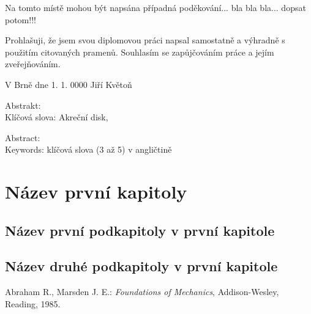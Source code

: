 \documentclass[12pt,notitlepage]{report}
\begin{document}
\normalsize 
\setcounter{page}{3}
\vspace{10mm}

\noindent Na tomto místě mohou být napsána případná poděkování... bla bla bla... dopsat potom!!!

\vspace{\fill}
\noindent Prohlašuji, že jsem svou diplomovou práci napsal samostatně a výhradně s použitím citovaných pramenů.
 Souhlasím se zapůjčováním práce a jejím zveřejňováním.

\bigskip
\noindent V Brně dne 1. 1. 0000 \hspace{\fill}Jiří Květoň
\newpage

%
%
\noindent
\noindent Abstrakt:
\noindent \\
\noindent Klíčová slova: Akreční disk, 
\vspace{10mm}

\noindent Abstract: 
\noindent \\
\noindent Keywords: klíčová slova (3 až 5) v angličtině
\newpage

%
%
\tableofcontents
\newpage

%
%
\chapter{Název první kapitoly}
\section{Název první podkapitoly v první kapitole}
\section{Název druhé podkapitoly v první kapitole}



\begin{thebibliography}{99}
 Abraham R., Marsden J. E.: {\em Foundations of Mechanics}, Addison-Wesley, Reading, 1985.
\end{thebibliography}
\end{document}
